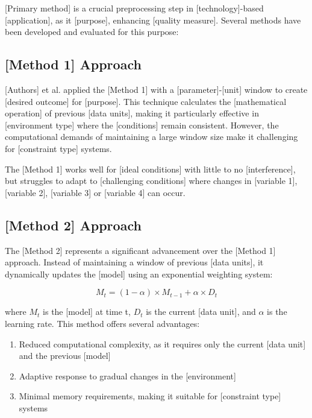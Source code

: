 [Primary method] is a crucial preprocessing step in [technology]-based [application], as it [purpose], enhancing [quality measure]. Several methods have been developed and evaluated for this purpose:

\subsection{[Method 1] Approach}

[Authors] et al. applied the [Method 1] with a [parameter]-[unit] window to create [desired outcome] for [purpose]. This technique calculates the [mathematical operation] of previous [data units], making it particularly effective in [environment type] where the [conditions] remain consistent. However, the computational demands of maintaining a large window size make it challenging for [constraint type] systems.

The [Method 1] works well for [ideal conditions] with little to no [interference], but struggles to adapt to [challenging conditions] where changes in [variable 1], [variable 2], [variable 3] or [variable 4] can occur.

\subsection{[Method 2] Approach}

The [Method 2] represents a significant advancement over the [Method 1] approach. Instead of maintaining a window of previous [data units], it dynamically updates the [model] using an exponential weighting system:

\begin{equation}
M_t = (1 - \alpha) \times M_{t-1} + \alpha \times D_t
\end{equation}

where $M_t$ is the [model] at time t, $D_t$ is the current [data unit], and $\alpha$ is the learning rate. This method offers several advantages:

\begin{enumerate}
\item Reduced computational complexity, as it requires only the current [data unit] and the previous [model]
\item Adaptive response to gradual changes in the [environment]  
\item Minimal memory requirements, making it suitable for [constraint type] systems
\end{enumerate}

